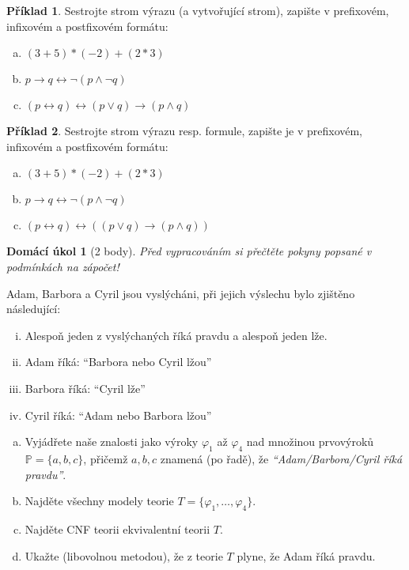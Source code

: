 \documentclass[a4paper]{article}
\theoremstyle{definition}
\newtheorem{problem}{Příklad}
\newtheorem*{ukol}{Domácí úkol}
\begin{document}
\medskip\begin{problem}
    Sestrojte strom výrazu (a vytvořující strom), zapište v prefixovém, infixovém a postfixovém formátu:
    \begin{enumerate}[(a)]
        \item $(3+5)*(-2)+(2*3)$
        \item $p \to q \leftrightarrow \neg (p \wedge \neg q)$
        \item $(p \leftrightarrow q) \leftrightarrow (p \vee q) \to (p \wedge q)$
    \end{enumerate}
\end{problem}



\medskip\begin{problem}
    Sestrojte strom výrazu resp. formule, zapište je v prefixovém, infixovém a postfixovém formátu:
    \begin{enumerate}[(a)]
        \item $(3+5)*(-2)+(2*3)$
        \item $p \to q \leftrightarrow \neg (p \wedge \neg q)$
        \item $(p \leftrightarrow q) \leftrightarrow ((p \vee q) \to (p \wedge q))$
    \end{enumerate}
\end{problem}


\medskip\begin{ukol}[2 body]
{\it Před vypracováním si přečtěte pokyny popsané v podmínkách na zápočet!}

\medskip    

Adam, Barbora a Cyril jsou vyslýcháni, při jejich výslechu bylo zjištěno následující:
\begin{enumerate}[(i)]
    \item Alespoň jeden z vyslýchaných říká pravdu a alespoň jeden lže.
    \item Adam říká: ``Barbora nebo Cyril lžou''
    \item Barbora říká: ``Cyril lže''
    \item Cyril říká: ``Adam nebo Barbora lžou''
\end{enumerate}
\begin{enumerate}[(a)]
    \item Vyjádřete naše znalosti jako výroky $\varphi_1$ až $\varphi_4$ nad množinou prvovýroků $\mathbb{P}=\{a,b,c\}$, přičemž $a,b,c$ znamená (po řadě), že {\it ``Adam/Barbora/Cyril říká pravdu''}.
    \item Najděte všechny modely teorie $T = \{\varphi_1, \dots, \varphi_4\}$.
    \item Najděte CNF teorii ekvivalentní teorii $T$.
    \item Ukažte (libovolnou metodou), že z teorie $T$ plyne, že Adam říká pravdu.
\end{enumerate}    
\end{ukol}
\end{document}
